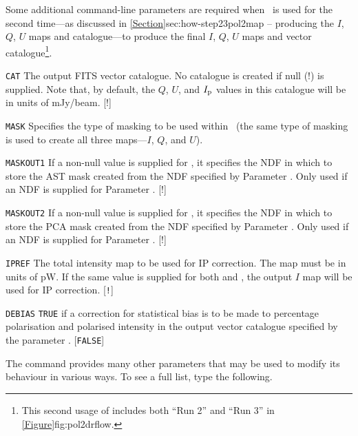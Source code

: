 Some additional command-line parameters are required when \poltwomap\ is
used for the second time---as discussed in
\cref{Section}{sec:how-step23}{pol2map -- producing the $I$, $Q$, $U$ maps
and catalogue}---to produce the final $I$, $Q$, $U$ maps and vector catalogue\footnote{This
second usage of  includes both ``Run 2'' and ``Run 3'' in
\cref{Figure}{fig:pol2drflow}{}.}.

\begin{aligndesc}

\item[\texttt{CAT}] The output FITS vector catalogue. No catalogue is
  created if null (!) is supplied. Note that, by default, the $Q$, $U$, and
  $I_{\textnormal{p}}$ values in this catalogue will be in units of mJy/beam. [!]

\item[\texttt{MASK}] Specifies the type of masking to be used within
  \makemap\ (the same type of masking is used to create all three maps---$I$,
  $Q$, and $U$).

\item[\texttt{MASKOUT1}] If a non-null value is supplied for ,
  it specifies the NDF in which to store the AST mask created from the NDF
  specified by Parameter . Only used if an NDF is supplied for
  Parameter . [!]

\item[\texttt{MASKOUT2}] If a non-null value is supplied for ,
  it specifies the NDF in which to store the PCA mask created from the NDF
  specified by Parameter . Only used if an NDF is supplied for
  Parameter . [!]

\item[\texttt{IPREF}] The total intensity map to be used for IP
  correction. The map must be in units of pW. If the same value is
  supplied for both  and , the output $I$
  map will be used for IP correction. [\texttt{!}]

\item[\texttt{DEBIAS}] \texttt{TRUE} if a correction for statistical bias is to
  be made to percentage polarisation and polarised intensity in the
  output vector catalogue specified by the parameter . [\texttt{FALSE}]
\end{aligndesc}

The  command provides many other parameters that may be used to
modify its behaviour in various ways. To see a full list, type the
following.

